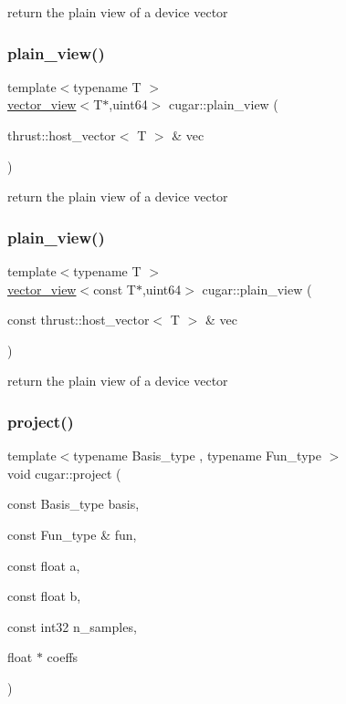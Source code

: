 return the plain view of a device vector \mbox{\label{namespacecugar_af50a23b6cb5eccef926723e8e1897642}} 
\subsubsection{\texorpdfstring{plain\+\_\+view()}{plain\_view()}\hspace{0.1cm}{\footnotesize\ttfamily [3/4]}}
{\footnotesize\ttfamily template$<$typename T $>$ \\
\hyperlink{structcugar_1_1vector__view}{vector\+\_\+view}$<$T$\ast$,uint64$>$ cugar\+::plain\+\_\+view (\begin{DoxyParamCaption}\item[{thrust\+::host\+\_\+vector$<$ T $>$ \&}]{vec }\end{DoxyParamCaption})}

return the plain view of a device vector \mbox{\label{namespacecugar_a6279f80126086dcd67bd15568afc6ea9}} 
\subsubsection{\texorpdfstring{plain\+\_\+view()}{plain\_view()}\hspace{0.1cm}{\footnotesize\ttfamily [4/4]}}
{\footnotesize\ttfamily template$<$typename T $>$ \\
\hyperlink{structcugar_1_1vector__view}{vector\+\_\+view}$<$const T$\ast$,uint64$>$ cugar\+::plain\+\_\+view (\begin{DoxyParamCaption}\item[{const thrust\+::host\+\_\+vector$<$ T $>$ \&}]{vec }\end{DoxyParamCaption})}

return the plain view of a device vector \mbox{\label{namespacecugar_ab80292a294ad672104b9e7d57ae99444}} 
\subsubsection{\texorpdfstring{project()}{project()}}
{\footnotesize\ttfamily template$<$typename Basis\+\_\+type , typename Fun\+\_\+type $>$ \\
void cugar\+::project (\begin{DoxyParamCaption}\item[{const Basis\+\_\+type}]{basis,  }\item[{const Fun\+\_\+type \&}]{fun,  }\item[{const float}]{a,  }\item[{const float}]{b,  }\item[{const int32}]{n\+\_\+samples,  }\item[{float $\ast$}]{coeffs }\end{DoxyParamCaption})}

